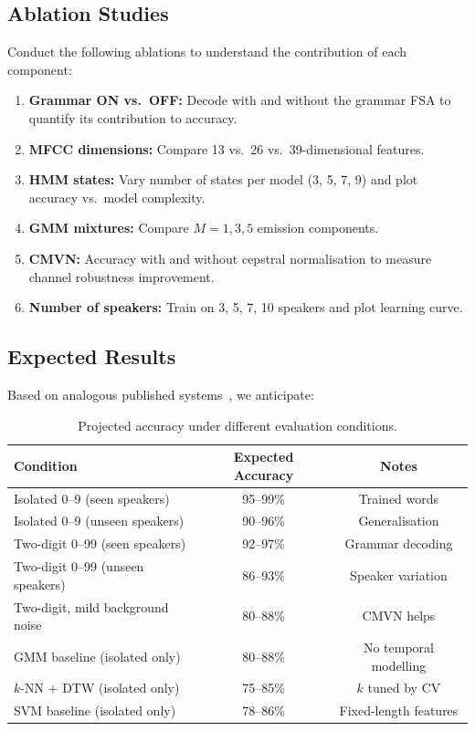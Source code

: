 \documentclass[12pt,a4paper]{article}
\begin{document}
\subsection{Ablation Studies}

Conduct the following ablations to understand the contribution of each component:

\begin{enumerate}[leftmargin=1.5em, itemsep=3pt]
  \item \textbf{Grammar ON vs.\ OFF:} Decode with and without the grammar
        FSA to quantify its contribution to accuracy.
  \item \textbf{MFCC dimensions:} Compare 13 vs.\ 26 vs.\ 39-dimensional
        features.
  \item \textbf{HMM states:} Vary number of states per model
        (3, 5, 7, 9) and plot accuracy vs.\ model complexity.
  \item \textbf{GMM mixtures:} Compare $M = 1, 3, 5$ emission components.
  \item \textbf{CMVN:} Accuracy with and without cepstral normalisation
        to measure channel robustness improvement.
  \item \textbf{Number of speakers:} Train on 3, 5, 7, 10 speakers and
        plot learning curve.
\end{enumerate}

\subsection{Expected Results}

Based on analogous published systems~\cite{kumar2012hindi,leonard1984tidigits},
we anticipate:

\begin{table}[h!]
\centering
\caption{Projected accuracy under different evaluation conditions.}
\label{tab:results}
\begin{tabular}{@{}lcc@{}}
\toprule
\textbf{Condition} & \textbf{Expected Accuracy} & \textbf{Notes} \\
\midrule
Isolated 0--9 (seen speakers)       & 95--99\% & Trained words \\
Isolated 0--9 (unseen speakers)     & 90--96\% & Generalisation \\
Two-digit 0--99 (seen speakers)     & 92--97\% & Grammar decoding \\
Two-digit 0--99 (unseen speakers)   & 86--93\% & Speaker variation \\
Two-digit, mild background noise    & 80--88\% & CMVN helps \\
\midrule
GMM baseline (isolated only)        & 80--88\% & No temporal modelling \\
$k$-NN + DTW (isolated only)        & 75--85\% & $k$ tuned by CV \\
SVM baseline (isolated only)        & 78--86\% & Fixed-length features \\
\bottomrule
\end{tabular}
\end{table}
\end{document}

